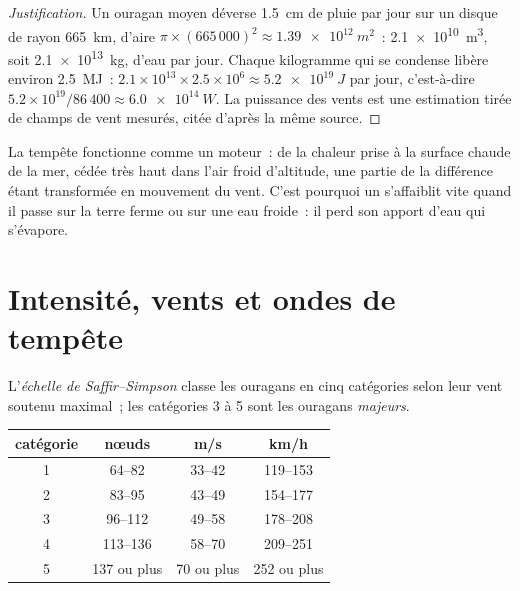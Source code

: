 \begin{proof}[Justification]
Un ouragan moyen déverse \qty{1.5}{cm} de pluie par jour sur un disque de
rayon \qty{665}{km}, d'aire $\pi \times (665\,000)^2 \approx
\qty{1.39e12}{m^2}$~: \qty{2.1e10}{m^3}, soit \qty{2.1e13}{kg}, d'eau par
jour. Chaque kilogramme qui se condense libère environ \qty{2.5}{MJ}~:
$2.1\times10^{13}
\times 2.5\times10^6 \approx \qty{5.2e19}{J}$ par jour, c'est-à-dire
$5.2\times10^{19}/86\,400 \approx \qty{6.0e14}{W}$. La puissance des vents
est une estimation tirée de champs de vent mesurés, citée d'après la même
source.
\end{proof}

La tempête fonctionne comme un moteur~: de la chaleur prise à la surface
chaude de la mer, cédée très haut dans l'air froid d'altitude, une partie de
la différence étant transformée en mouvement du vent. C'est pourquoi un
 s'affaiblit vite quand il passe sur la terre ferme ou sur
une eau froide~: il perd son apport d'eau qui s'évapore.

\section{Intensité, vents et ondes de tempête}

\begin{definition}\label{def:g10:storms-and-cyclones:scale}
L'\emph{échelle de Saffir--Simpson}
classe les ouragans en cinq catégories selon leur vent soutenu maximal~;
les catégories 3 à 5 sont les ouragans \emph{majeurs}.
\end{definition}

\begin{center}
\small
\begin{tabular}{cccc}
\hline
catégorie & nœuds & \unit{m/s} & \unit{km/h} \\
\hline
1 & 64--82 & 33--42 & 119--153 \\
2 & 83--95 & 43--49 & 154--177 \\
3 & 96--112 & 49--58 & 178--208 \\
4 & 113--136 & 58--70 & 209--251 \\
5 & 137 ou plus & 70 ou plus & 252 ou plus \\
\hline
\end{tabular}
\end{center}

